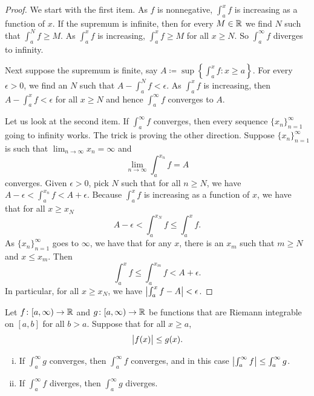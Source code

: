 \begin{proof}
We start with the first item.
As $f$ is nonnegative,
$\int_a^x f$ is increasing as a function of $x$.
If the supremum is infinite, then for every $M \in {\mathbb{R}}$
we find $N$ such that $\int_a^N f \geq M$.  As $\int_a^x f$
is increasing, $\int_a^x f \geq M$ for all $x \geq N$.  So
$\int_a^\infty f$ diverges to infinity.

Next suppose the supremum is finite, say
$A \coloneqq \sup \left\{ \int_a^x f : x \geq a \right\}$.
For every $\epsilon > 0$, we find an $N$ such that
$A - \int_a^N f < \epsilon$.  As $\int_a^x f$ is increasing,
then
$A - \int_a^x f < \epsilon$ for all $x \geq N$ and hence
$\int_a^\infty f$ converges to $A$.

Let us look at the second item.
If $\int_a^\infty f$ converges, then every sequence $\{ x_n \}_{n=1}^\infty$ going to
infinity works.  The trick is
proving the other direction.  Suppose $\{ x_n \}_{n=1}^\infty$ is such that
$\lim_{n\to\infty} x_n = \infty$ and
\begin{equation*}
\lim_{n\to\infty} \int_a^{x_n} f = A
\end{equation*}
converges.  Given $\epsilon > 0$, pick $N$ such that for
all $n \geq N$, we have
$A - \epsilon < \int_a^{x_n} f < A + \epsilon$.
Because $\int_a^x f$ is increasing as a function of $x$, we have that for all
$x \geq x_N$
\begin{equation*}
A - \epsilon < \int_a^{x_N} f \leq \int_a^x f .
\end{equation*}
As $\{ x_n \}_{n=1}^\infty$ goes to $\infty$, we have that for any 
$x$, there is an $x_m$ such that $m \geq N$ and $x \leq x_m$.  Then
\begin{equation*}
\int_a^{x} f \leq \int_a^{x_m} f < A + \epsilon .
\end{equation*}
In particular, for all $x \geq x_N$, we have
$\left\lvert {\int_a^{x} f - A} \right\rvert < \epsilon$.
\end{proof}

\begin{prop}%
Let
$f \colon [a,\infty) \to {\mathbb{R}}$ and
$g \colon [a,\infty) \to {\mathbb{R}}$ be functions
that are Riemann integrable on $[a,b]$ for all $b > a$.   Suppose
that for all $x \geq a$,
\begin{equation*}
\bigl\lvert {f(x)} \bigr\rvert \leq g(x) .
\end{equation*}
\begin{enumerate}[(i)]
\item If $\int_a^\infty g$ converges, then $\int_a^\infty f$ converges,
and in this case 
$\left\lvert {\int_a^\infty f} \right\rvert \leq \int_a^\infty g$.
\item If $\int_a^\infty f$ diverges, then $\int_a^\infty g$ diverges.
\end{enumerate}
\end{prop}

